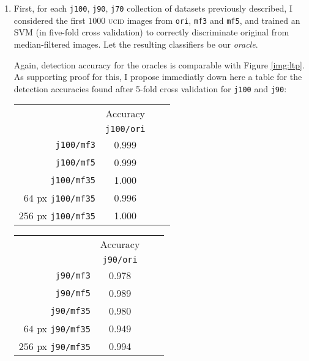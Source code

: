 \documentclass[10pt,a4paper]{report}
\newcommand{\code}[1]{\texttt{#1}}
\begin{document}
\begin{enumerate}
\item First, for each \code{j100}, \code{j90}, \code{j70} collection of
  datasets previously described, I considered the first $1000$
  \textsc{ucid} images from \code{ori}, \code{mf3} and \code{mf5}, and trained
  an SVM (in five-fold cross validation) to correctly discriminate original from
  median-filtered images. Let the resulting classifiers be our \emph{oracle}.

  Again, detection accuracy for the oracles is comparable with Figure \ref{img:ltp}. As
  supporting proof for this, I propose immediatly down here a table for the
  detection accuracies found after 5-fold cross validation for \code{j100} and \code{j90}:

\vfill
\begin{table}[!htbp]
    \centering

    \begin{subtable}{.4\linewidth}
    \begin{tabular}{r|ccc}
      & \small{Accuracy} \\  &   \code{j100/ori}\\
      \hline
      \code{j100/mf3}  & 0.999 \\
      \code{j100/mf5}  & 0.999 \\
      \code{j100/mf35} & 1.000 \\
      \tiny{$64$ px}   \normalsize{\code{j100/mf35}} & 0.996 \\
      \tiny{$256$ px} \normalsize{\code{j100/mf35}}  & 1.000 \\
    \end{tabular}
    \end{subtable}
    \begin{subtable}{.4\linewidth}
    \begin{tabular}{r|ccc}
      & \small{Accuracy} \\  &   \code{j90/ori}\\
      \hline
      \code{j90/mf3}  & 0.978 \\
      \code{j90/mf5}  & 0.989 \\
      \code{j90/mf35} & 0.980 \\
      \tiny{$64$ px}   \normalsize{\code{j90/mf35}} & 0.949 \\
      \tiny{$256$ px} \normalsize{\code{j90/mf35}}  & 0.994 \\
    \end{tabular}
    \end{subtable}


\end{table}
\end{enumerate}
\end{document}

